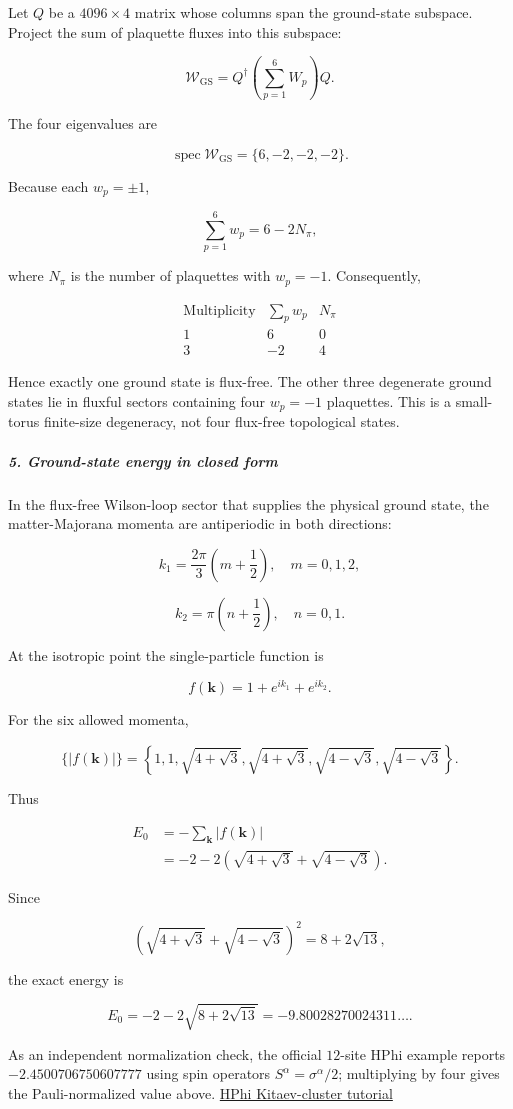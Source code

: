 Let $Q$ be a $4096\times4$ matrix whose columns span the ground-state subspace. Project the sum of plaquette fluxes into this subspace:

\[
\mathcal W_{\mathrm{GS}} = Q^\dagger\left(\sum_{p=1}^{6}W_p\right)Q.
\]

The four eigenvalues are

\[
\operatorname{spec}\mathcal W_{\mathrm{GS}} = \{6,-2,-2,-2\}.
\]

Because each $w_p=\pm1$,

\[
\sum_{p=1}^{6}w_p=6-2N_\pi,
\]

where $N_\pi$ is the number of plaquettes with $w_p=-1$. Consequently,

\[
\begin{array}{c|c|c}
\text{Multiplicity}&\sum_p w_p&N_\pi\\ \hline
1&6&0\\
3&-2&4
\end{array}
\]

Hence exactly one ground state is flux-free. The other three degenerate ground states lie in fluxful sectors containing four $w_p=-1$ plaquettes. This is a small-torus finite-size degeneracy, not four flux-free topological states.

\subparagraph*{5. Ground-state energy in closed form}

In the flux-free Wilson-loop sector that supplies the physical ground state, the matter-Majorana momenta are antiperiodic in both directions:

\[
k_1=\frac{2\pi}{3}\left(m+\frac12\right), \quad m=0,1,2,
\]

\[
k_2=\pi\left(n+\frac12\right), \quad n=0,1.
\]

At the isotropic point the single-particle function is

\[
f(\mathbf k)=1+e^{ik_1}+e^{ik_2}.
\]

For the six allowed momenta,

\[
\{|f(\mathbf k)|\} = \left\{ 1,1, \sqrt{4+\sqrt3},\sqrt{4+\sqrt3}, \sqrt{4-\sqrt3},\sqrt{4-\sqrt3} \right\}.
\]

Thus

\[
\begin{aligned}
E_0
&=-\sum_{\mathbf k}|f(\mathbf k)|\\
&=-2-2\left(\sqrt{4+\sqrt3}+\sqrt{4-\sqrt3}\right).
\end{aligned}
\]

Since

\[
\left(\sqrt{4+\sqrt3}+\sqrt{4-\sqrt3}\right)^2 =8+2\sqrt{13},
\]

the exact energy is

\[
E_0=-2-2\sqrt{8+2\sqrt{13}} =-9.80028270024311\ldots .
\]

As an independent normalization check, the official $12$-site HPhi example reports $-2.4500706750607777$ using spin operators $S^\alpha=\sigma^\alpha/2$; multiplying by four gives the Pauli-normalized value above. \href{\detokenize{https://issp-center-dev.github.io/HPhi/manual/develop/tutorial/en/html/finite_temperature/Kitaev.html}}{HPhi Kitaev-cluster tutorial}
